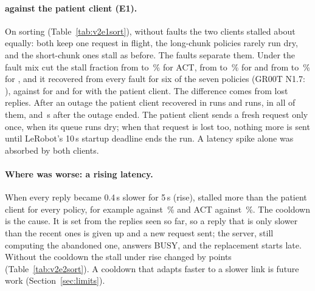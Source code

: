 \paragraph{\drtc{} against the patient client (E1).} On sorting (Table~\ref{tab:v2e1sort}), without faults the two
clients stalled about equally: both keep one request in flight, the long-chunk policies rarely run dry, and the
short-chunk ones stall as before. The faults separate them. Under the fault mix \drtc{} cut the stall fraction from
 to \,\% for ACT, from  to \,\% for
\smolvla{} and from  to \,\% for \pizerofive{}, and it recovered from every
fault for six of the seven policies (GR00T N1.7: ), against  for
\smolvla{} and  for \groot{} with the patient client. The difference comes from lost
replies. After an outage the patient client recovered in  \smolvla{} runs and
 \groot{} runs, \drtc{} in all of them,  and
\,s after the outage ended. The patient client sends a fresh request only once, when its
queue runs dry; when that request is lost too, nothing more is sent until LeRobot's 10\,s startup deadline ends the
run. A latency spike alone was absorbed by both clients.

\paragraph{Where \drtc{} was worse: a rising latency.} When every reply became 0.4\,s slower for 5\,s (rise),
\drtc{} stalled more than the patient client for every policy, for example \smolvla{}  against
\,\% and ACT  against \,\%. The cooldown is the cause. It
is set from the replies seen so far, so a reply that is only slower than the recent ones is given up and a new request
sent; the server, still computing the abandoned one, answers BUSY, and the replacement starts late. Without the
cooldown the stall under rise changed by  points (Table~\ref{tab:v2e2sort}). A cooldown
that adapts faster to a slower link is future work (Section~\ref{sec:limits}).

